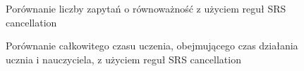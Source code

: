 

\begin{figure}[H]
\centering

\caption{Porównanie liczby zapytań o równoważność z użyciem reguł SRS cancellation}
\label{fig:cancellationEq}
\end{figure}

\begin{figure}[H]
\centering

\caption{Porównanie całkowitego czasu uczenia, obejmującego czas działania ucznia i nauczyciela, z użyciem reguł SRS cancellation}
\label{fig:cancellationTime}
\end{figure}
